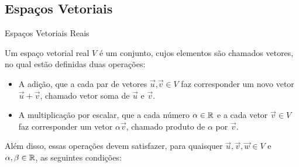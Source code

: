 \subsection*{Espaços Vetoriais}

\begin{frame}[label=vetores]{Espaços Vetoriais Reais}

Um {\color{blue}espaço vetorial real} $V$ é um conjunto, cujos elementos são chamados {\color{blue} vetores}, no qual estão definidas duas operações:

\begin{itemize}
\item A {\color{blue} adição}, que a cada par de vetores $\vec{u}$,$\vec{v}\in V$ faz corresponder um novo vetor $\vec{u}+\vec{v}$, chamado {\color{blue}vetor soma} de $\vec{u}$ e $\vec{v}$.

\item A {\color{blue} multiplicação por escalar}, que a cada número $\alpha\in \mathbb{R}$ e a cada vetor $\vec{v}\in V$ faz corresponder um vetor $\alpha \vec{v}$, chamado {\color{blue}produto de $\alpha$ por $\vec{v}$}.
\end{itemize}
Além disso, essas operações devem satisfazer, para quaisquer $\vec{u},\vec{v},\vec{w}\in V$ e $\alpha,\beta \in \mathbb{R}$, as seguintes condições:
\end{frame}



